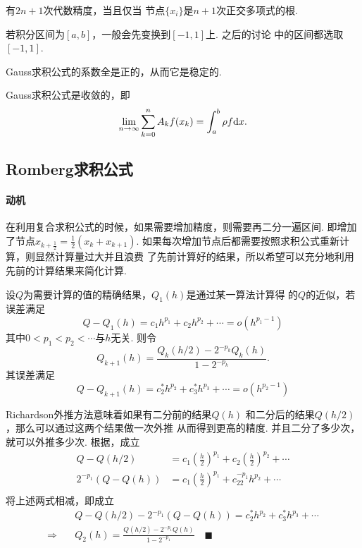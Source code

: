   \begin{cor}
    有$2n+1$次代数精度，当且仅当
    节点$\{x_i\}$是$n+1$次正交多项式的根.
  \end{cor}
  \remark
    若积分区间为$[a, b]$，一般会先变换到$[-1, 1]$上. 之后的讨论
    中的区间都选取$[-1, 1]$.

  \begin{pos}
    Gauss求积公式的系数全是正的，从而它是稳定的.
  \end{pos}

  \begin{thm}
      Gauss求积公式是收敛的，即
      \[
        \lim_{n\to\infty}\sum_{k=0}^nA_k\mathnormal{f}(x_k)
        = \int_a^b\rho\mathnormal{f}\mathrm{d} x.
      \]
  \end{thm}

\subsection{Romberg求积公式}
  \paragraph{动机}
    在利用复合求积公式的时候，如果需要增加精度，则需要再二分一遍区间.
    即增加了节点$x_{k+\frac{1}{2}} = \frac{1}{2}(x_k + x_{k+1})$.
    如果每次增加节点后都需要按照求积公式重新计算，则显然计算量过大并且浪费
    了先前计算好的结果，所以希望可以充分地利用先前的计算结果来简化计算.

  \begin{alg}[Richardson外推方法]
    \label{alg: Richardson外推方法}
    设$Q$为需要计算的值的精确结果，$Q_1(h)$是通过某一算法计算得
    的$Q$的近似，若误差满足
    \begin{equation}
      \label{equ: Q-Q(h)}
      Q-Q_1(h) = c_1h^{p_1} + c_2h^{p_2} + \cdots = o(h^{p_1-1})
    \end{equation}
    其中$0<p_1<p_2<\cdots$与$h$无关. 则令
    \[
      Q_{k+1}(h) = \frac{Q_k(h/2) - 2^{-p_k}Q_k(h)}{1-2^{-p_k}}.
    \]
    其误差满足
    \[
      Q-Q_{k+1}(h) = c_2^*h^{p_2} + c_3^*h^{p_3} + \cdots = o(h^{p_2-1})
    \]
  \end{alg}
  \remark
    Richardson外推方法意味着如果有二分前的结果$Q(h)$
    和二分后的结果$Q(h/2)$，那么可以通过这两个结果做一次外推
    从而得到更高的精度. 并且二分了多少次，就可以外推多少次.
  \proof
    根据，成立
    \[\begin{split}
      Q - Q(h/2) &= c_1\left(\frac{h}{2}\right)^{p_1} + c_2\left(\frac{h}{2}\right)^{p_2} + \cdots\\
      2^{-p_1}(Q-Q(h)) &= c_1\left(\frac{h}{2}\right)^{p_1} + c_22^{-p_1}h^{p_2} + \cdots\\
    \end{split}\]
    将上述两式相减，即成立
    \[\begin{split}
      &Q-Q(h/2) - 2^{-p_1}(Q-Q(h)) = c_2^*h^{p_2} + c_3^*h^{p_3} + \cdots\\
      \Rightarrow\quad&
      Q_2(h) = \frac{Q(h/2) - 2^{-p_1}Q(h)}{1-2^{-p_1}}\quad\blacksquare
    \end{split}\]

